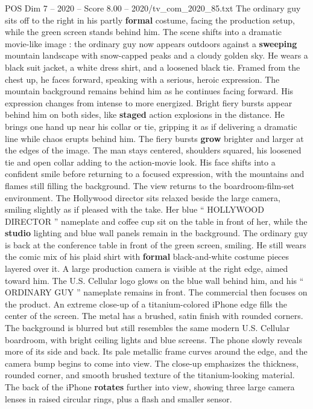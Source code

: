 \begin{textsample}{POS Dim 7 – 2020 – Score 8.00 – 2020/tv\_com\_2020\_85.txt}
The ordinary guy sits off to the right in his partly \textbf{formal} costume, facing the production setup, while the green screen stands behind him.
The scene shifts into a dramatic movie-like image : the ordinary guy now appears outdoors against a \textbf{sweeping} mountain landscape with snow-capped peaks and a cloudy golden sky.
He wears a black suit jacket, a white dress shirt, and a loosened black tie.
Framed from the chest up, he faces forward, speaking with a serious, heroic expression.
The mountain background remains behind him as he continues facing forward.
His expression changes from intense to more energized.
Bright fiery bursts appear behind him on both sides, like \textbf{staged} action explosions in the distance.
He brings one hand up near his collar or tie, gripping it as if delivering a dramatic line while chaos erupts behind him.
The fiery bursts \textbf{grow} brighter and larger at the edges of the image.
The man stays centered, shoulders squared, his loosened tie and open collar adding to the action-movie look.
His face shifts into a confident smile before returning to a focused expression, with the mountains and flames still filling the background.
The view returns to the boardroom-film-set environment.
The Hollywood director sits relaxed beside the large camera, smiling slightly as if pleased with the take.
Her blue “ HOLLYWOOD DIRECTOR ” nameplate and coffee cup sit on the table in front of her, while the \textbf{studio} lighting and blue wall panels remain in the background.
The ordinary guy is back at the conference table in front of the green screen, smiling.
He still wears the comic mix of his plaid shirt with \textbf{formal} black-and-white costume pieces layered over it.
A large production camera is visible at the right edge, aimed toward him.
The U.S.
Cellular logo glows on the blue wall behind him, and his “ ORDINARY GUY ” nameplate remains in front.
The commercial then focuses on the product.
An extreme close-up of a titanium-colored iPhone edge fills the center of the screen.
The metal has a brushed, satin finish with rounded corners.
The background is blurred but still resembles the same modern U.S.
Cellular boardroom, with bright ceiling lights and blue screens.
The phone slowly reveals more of its side and back.
Its pale metallic frame curves around the edge, and the camera bump begins to come into view.
The close-up emphasizes the thickness, rounded corner, and smooth brushed texture of the titanium-looking material.
The back of the iPhone \textbf{rotates} further into view, showing three large camera lenses in raised circular rings, plus a flash and smaller sensor.

\end{textsample}
